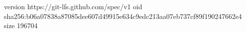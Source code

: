 version https://git-lfs.github.com/spec/v1
oid sha256:b06a07838a87085dee607d49915e634c9edc213aa07eb737cf89f190247662e4
size 196704
